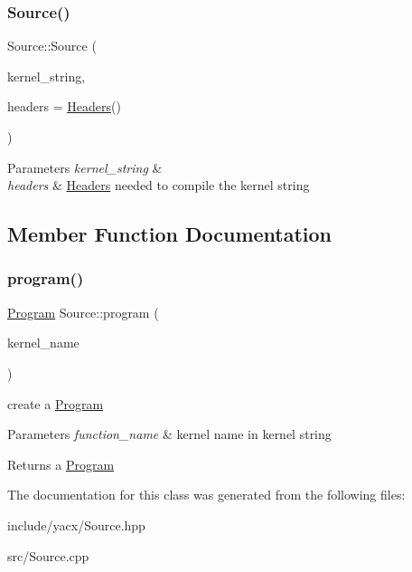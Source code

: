 \subsubsection{\texorpdfstring{Source()}{Source()}}
{\footnotesize\ttfamily Source\+::\+Source (\begin{DoxyParamCaption}\item[{std\+::string}]{kernel\+\_\+string,  }\item[{\hyperlink{classyacx_1_1_headers}{Headers}}]{headers = {\ttfamily \hyperlink{classyacx_1_1_headers}{Headers}()} }\end{DoxyParamCaption})\hspace{0.3cm}{\ttfamily [explicit]}}


\begin{DoxyParams}{Parameters}
{\em kernel\+\_\+string} & \\
\hline
{\em headers} & \hyperlink{classyacx_1_1_headers}{Headers} needed to compile the kernel string \\
\hline
\end{DoxyParams}


\subsection{Member Function Documentation}
\mbox{\label{classyacx_1_1_source_a2d95fc130b3c3d6a2a1f20097d5a278f}} 
\subsubsection{\texorpdfstring{program()}{program()}}
{\footnotesize\ttfamily \hyperlink{classyacx_1_1_program}{Program} Source\+::program (\begin{DoxyParamCaption}\item[{const std\+::string \&}]{kernel\+\_\+name }\end{DoxyParamCaption})}

create a \hyperlink{classyacx_1_1_program}{Program} 
\begin{DoxyParams}{Parameters}
{\em function\+\_\+name} & kernel name in kernel string \\
\hline
\end{DoxyParams}
\begin{DoxyReturn}{Returns}
a \hyperlink{classyacx_1_1_program}{Program} 
\end{DoxyReturn}


The documentation for this class was generated from the following files\+:\begin{DoxyCompactItemize}
\item 
include/yacx/Source.\+hpp\item 
src/Source.\+cpp\end{DoxyCompactItemize}

